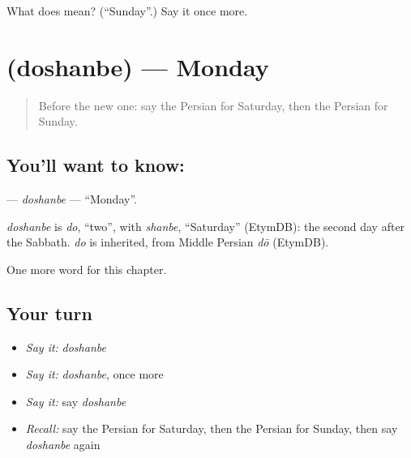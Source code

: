 \begin{tcolorbox}[breakable,colback=teal!4,colframe=teal!35!black,title={Before you move on}]
What does  mean? (\textquotedblleft{}Sunday\textquotedblright{}.) Say it once more.
\end{tcolorbox}
\section[\texorpdfstring{\fa{دوشنبه} (doshanbe)}{دوشنبه (doshanbe)}]{ (doshanbe) — Monday}

\label{lesson:FA-C81-doshanbe}



\begin{quote}
Before the new one: say the Persian for Saturday, then the Persian for Sunday.
\end{quote}

\subsection*{You'll want to know: }
\textbf{} — \emph{doshanbe} — \textquotedblleft{}Monday\textquotedblright{}.

\begin{cousinweb}
\emph{doshanbe} is \emph{do}, \textquotedblleft{}two\textquotedblright{}, with \emph{shanbe}, \textquotedblleft{}Saturday\textquotedblright{} (EtymDB): the second day after the Sabbath. \emph{do} is inherited, from Middle Persian \emph{dō} (EtymDB).
\end{cousinweb}

\begin{grammarlens}[title={What you've built}]
One more word for this chapter.
\end{grammarlens}

\subsection*{Your turn}
\begin{itemize}
\raggedright
  \item \emph{Say it:} \emph{doshanbe}
  \item \emph{Say it:} \emph{doshanbe}, once more
  \item \emph{Say it:} say \emph{doshanbe}
  \item \emph{Recall:} say the Persian for Saturday, then the Persian for Sunday, then say \emph{doshanbe} again
\end{itemize}

